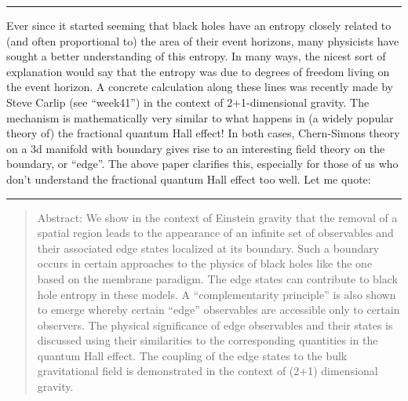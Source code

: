 \documentclass{article}
\def\tightlist{}
\renewcommand{\texttt}[1]{%
  \begingroup
  \ttfamily
  \begingroup\lccode`~=`/\lowercase{\endgroup\def~}{/\discretionary{}{}{}}%
  \begingroup\lccode`~=`[\lowercase{\endgroup\def~}{[\discretionary{}{}{}}%
  \begingroup\lccode`~=`.\lowercase{\endgroup\def~}{.\discretionary{}{}{}}%
  \catcode`/=\active\catcode`[=\active\catcode`.=\active
  \scantokens{#1\noexpand}%
  \endgroup
}
\begin{document}
\begin{center}\rule{0.5\linewidth}{0.5pt}\end{center}


Ever since it started seeming that black holes have an entropy closely
related to (and often proportional to) the area of their event horizons,
many physicists have sought a better understanding of this entropy. In
many ways, the nicest sort of explanation would say that the entropy was
due to degrees of freedom living on the event horizon. A concrete
calculation along these lines was recently made by Steve Carlip (see
``week41'') in the context of 2+1-dimensional gravity. The mechanism is
mathematically very similar to what happens in (a widely popular theory
of) the fractional quantum Hall effect! In both cases, Chern-Simons
theory on a 3d manifold with boundary gives rise to an interesting field
theory on the boundary, or ``edge''. The above paper clarifies this,
especially for those of us who don't understand the fractional quantum
Hall effect too well. Let me quote:

\begin{center}\rule{0.5\linewidth}{0.5pt}\end{center}

\begin{quote}
Abstract: We show in the context of Einstein gravity that the removal of
a spatial region leads to the appearance of an infinite set of
observables and their associated edge states localized at its boundary.
Such a boundary occurs in certain approaches to the physics of black
holes like the one based on the membrane paradigm. The edge states can
contribute to black hole entropy in these models. A ``complementarity
principle'' is also shown to emerge whereby certain ``edge'' observables
are accessible only to certain observers. The physical significance of
edge observables and their states is discussed using their similarities
to the corresponding quantities in the quantum Hall effect. The coupling
of the edge states to the bulk gravitational field is demonstrated in
the context of (2+1) dimensional gravity.
\end{quote}
\end{document}
